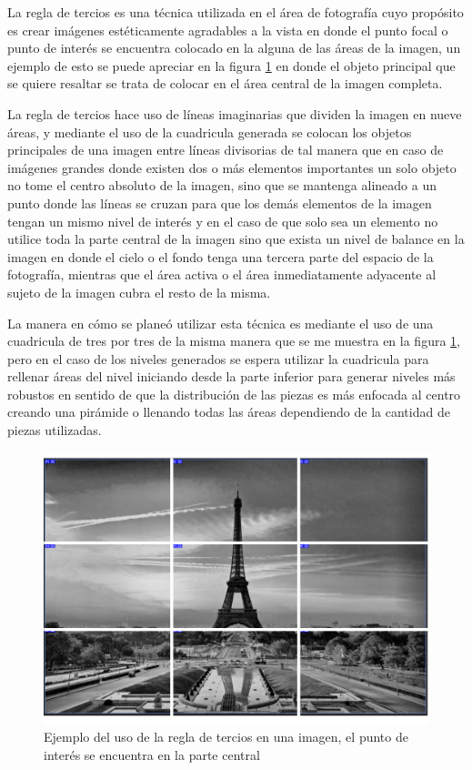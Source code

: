 La regla de tercios es una técnica utilizada en el área de fotografía cuyo
propósito es crear imágenes estéticamente agradables a la vista en donde el
punto focal o punto de interés se encuentra colocado en la alguna de las áreas
de la imagen, un ejemplo de esto se puede apreciar en la figura
\ref{figure:ruleofthirdsexample} en donde el objeto principal que se quiere
resaltar se trata de colocar en el área central de la imagen completa.

La regla de tercios hace uso de líneas imaginarias que dividen la imagen en nueve
áreas, y mediante el uso de la
cuadricula generada se colocan los objetos principales de una imagen entre
líneas divisorias de tal manera que en caso de imágenes grandes donde existen dos
o más elementos importantes un solo objeto no tome el centro absoluto de la
imagen, sino que se mantenga alineado a un punto donde las líneas se cruzan para
que los demás elementos de la imagen tengan un mismo nivel de interés y en el
caso de que solo sea un elemento no utilice toda la parte central de la imagen
sino que exista un nivel de balance en la imagen en donde el cielo o el fondo
tenga una tercera parte del espacio de la fotografía, mientras que el área
activa o el área inmediatamente adyacente al sujeto de la imagen cubra el
resto de la misma.

La manera en cómo se planeó utilizar esta técnica es mediante el uso de una
cuadricula de tres por tres de la misma manera que se me muestra en la figura
\ref{figure:ruleofthirdsexample}, pero en el caso de los niveles generados se
espera utilizar la cuadricula para rellenar áreas del nivel iniciando desde la
parte inferior para generar niveles más robustos en sentido de que la
distribución de las piezas es más enfocada al centro creando una pirámide o
llenando todas las áreas dependiendo de la cantidad de piezas utilizadas. 

\begin{figure}
  \centering
  \includegraphics[width=1.0\textwidth]{img/ruleofthirds_example.png}
  \caption{Ejemplo del uso de la regla de tercios en una imagen, el punto de interés se encuentra en la parte central}
  \label{figure:ruleofthirdsexample}
\end{figure}

